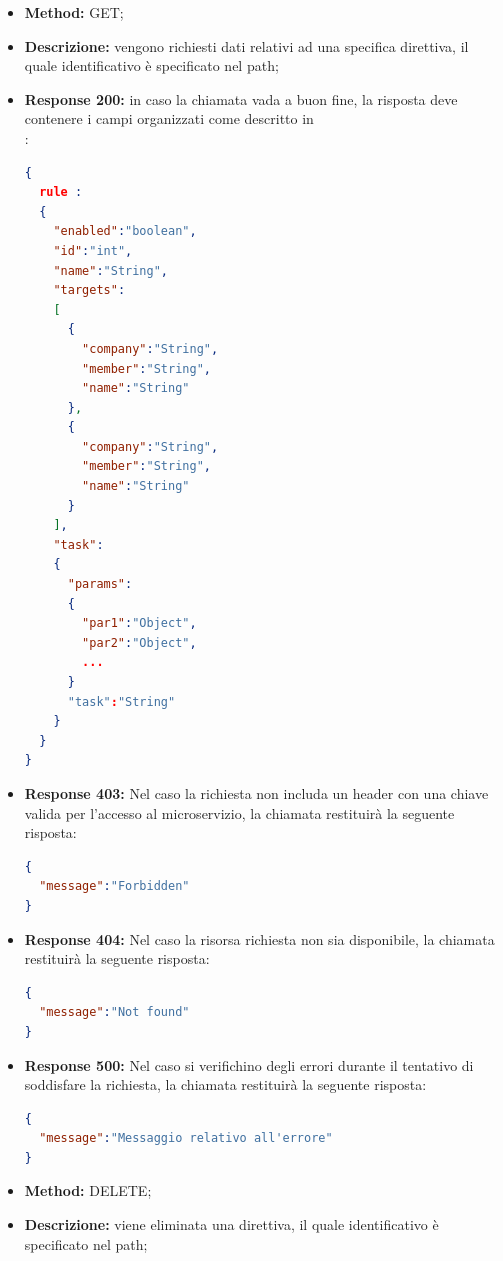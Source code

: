 \begin{itemize}
\begin{itemize}
\item \textbf{Method:} GET;
\item \textbf{Descrizione:} vengono richiesti dati relativi ad una specifica direttiva, il quale identificativo è specificato nel path;
\item \textbf{Response 200:} in caso la chiamata vada a buon fine, la risposta deve contenere i campi organizzati come descritto in \\:
\begin{lstlisting}[language=json,firstnumber=1]
{
  rule :
  {
    "enabled":"boolean",
    "id":"int",
    "name":"String",
    "targets":
    [
      {
        "company":"String",
        "member":"String",
        "name":"String"
      },
      {
        "company":"String",
        "member":"String",
        "name":"String"
      }
    ],
    "task":
    {
      "params":
      {
        "par1":"Object",
        "par2":"Object",
        ...
      }
      "task":"String"
    }
  }
}
\end{lstlisting}
\item \textbf{Response 403:} Nel caso la richiesta non includa un header  con una chiave valida per l'accesso al microservizio, la chiamata restituirà la seguente risposta:
\begin{lstlisting}[language=json,firstnumber=1]
{
  "message":"Forbidden"
}
\end{lstlisting}

\item \textbf{Response 404:} Nel caso la risorsa richiesta non sia disponibile, la chiamata restituirà la seguente risposta:
\begin{lstlisting}[language=json,firstnumber=1]
{
  "message":"Not found"
}
\end{lstlisting}
\item \textbf{Response 500:} Nel caso si verifichino degli errori durante il tentativo di soddisfare la richiesta, la chiamata restituirà la seguente risposta:
\begin{lstlisting}[language=json,firstnumber=1]
{
  "message":"Messaggio relativo all'errore"
}
\end{lstlisting}
\end{itemize}

\begin{itemize}
\item \textbf{Method:} DELETE;
\item \textbf{Descrizione:} viene eliminata una direttiva, il quale identificativo è specificato nel path;


\end{itemize}
\end{itemize}
